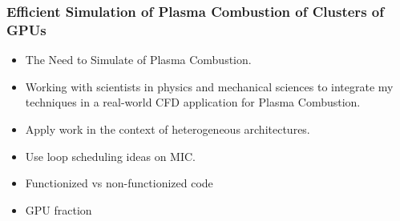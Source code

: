 
\begin{frame}[label=workWithGPUs]
  \frametitle{Efficient Simulation of Plasma Combustion of Clusters of GPUs}
  \begin{itemize}
  \small \item \small The Need to Simulate of Plasma Combustion. 
  \item \small Working with scientists in physics and mechanical sciences to integrate my techniques in a real-world CFD application for Plasma Combustion.
  \item \small Apply work in the context of heterogeneous architectures.
  \item \small Use loop scheduling ideas on MIC.
  \item \small Functionized vs non-functionized code
  \item \small GPU fraction
  \end{itemize}
\end{frame}

  


